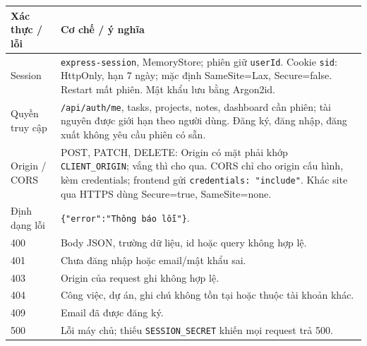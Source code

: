 \begin{longtable}{@{}P{.21\linewidth}P{.70\linewidth}@{}}
\toprule
\textbf{Xác thực / lỗi} & \textbf{Cơ chế / ý nghĩa} \\
\midrule
\endhead
Session & \texttt{express-session}, MemoryStore; phiên giữ \texttt{userId}. Cookie \texttt{sid}: HttpOnly, hạn 7 ngày; mặc định SameSite=Lax, Secure=false. Restart mất phiên. Mật khẩu lưu bằng Argon2id. \\
Quyền truy cập & \texttt{/api/auth/me}, tasks, projects, notes, dashboard cần phiên; tài nguyên được giới hạn theo người dùng. Đăng ký, đăng nhập, đăng xuất không yêu cầu phiên có sẵn. \\
Origin / CORS & POST, PATCH, DELETE: Origin có mặt phải khớp \texttt{CLIENT\_ORIGIN}; vắng thì cho qua. CORS chỉ cho origin cấu hình, kèm credentials; frontend gửi \texttt{credentials: "include"}. Khác site qua HTTPS dùng Secure=true, SameSite=none. \\
Định dạng lỗi & \texttt{\{"error":"Thông báo lỗi"\}}. \\
400 & Body JSON, trường dữ liệu, id hoặc query không hợp lệ. \\
401 & Chưa đăng nhập hoặc email/mật khẩu sai. \\
403 & Origin của request ghi không hợp lệ. \\
404 & Công việc, dự án, ghi chú không tồn tại hoặc thuộc tài khoản khác. \\
409 & Email đã được đăng ký. \\
500 & Lỗi máy chủ; thiếu \texttt{SESSION\_SECRET} khiến mọi request trả 500. \\
\bottomrule
\end{longtable}
\endgroup
